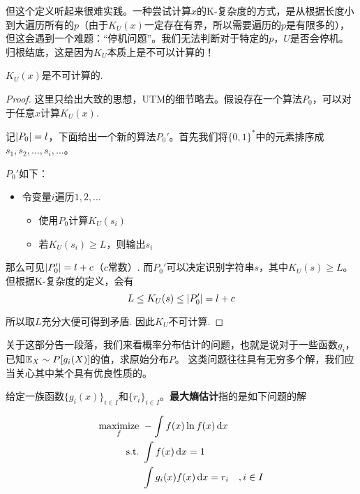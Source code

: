 但这个定义听起来很难实践。一种尝试计算$x$的K-复杂度的方式，是从根据长度小到大遍历所有的$p$（由于$K_U(x)$一定存在有界，所以需要遍历的$p$是有限多的），但这会遇到一个难题：“停机问题”。我们无法判断对于特定的$p$，$U$是否会停机。 归根结底，这是因为$K_U$本质上是不可以计算的！
\begin{theorem}
    $K_U(x)$是不可计算的. 
\end{theorem}
\begin{proof}
    这里只给出大致的思想，UTM的细节略去。假设存在一个算法$P_0$，可以对于任意$x$计算$K_U(x)$. 

    记$\left\vert P_0\right\vert = l$，下面给出一个新的算法$P_0'$。首先我们将$\{0,1\}^*$中的元素排序成$s_1,s_2,\dots,s_i,\dots$。
    
    $P_0'$如下：
    \begin{itemize}
        \item 令变量$i$遍历$1,2,\dots$
        \begin{itemize}
            \item 使用$P_0$计算$K_U(s_i)$
            \item 若$K_U(s_i) \ge L$，则输出$s_i$
        \end{itemize}
    \end{itemize}

    那么可见$\left\vert P_0'\right\vert = l + c$（$c$常数）. 而$P_0'$可以决定识别字符串$s$，其中$K_U(s) \ge L$。但根据K-复杂度的定义，会有 
    \[
    L \le K_U(s) \le \left\vert P_0'\right\vert = l + c
    \]

    所以取$L$充分大便可得到矛盾. 因此$K_U$不可计算.
\end{proof}

关于这部分告一段落，我们来看概率分布估计的问题，也就是说对于一些函数$g_i$，已知$\mathbb{E}_X\sim P [g_i(X)]$的值，求原始分布$P$。 这类问题往往具有无穷多个解，我们应当关心其中某个具有优良性质的。 
    \begin{definition}[最大熵估计]
        给定一族函数$\{g_i(x)\}_{i\in I}$和$\{r_i\}_{i \in I}$。\textbf{最大熵估计}指的是如下问题的解 
        
        \begin{align*}
            \operatorname*{maximize}_{f} \ & -\int f(x) \ln f(x) \mathop{}\!\mathrm{d}x \\
            \text{s.t.} \ & \int f(x) \mathop{}\!\mathrm{d}x = 1 \\
            \ & \int g_i(x)f(x) \mathop{}\!\mathrm{d}x = r_i\quad ,i\in I
        \end{align*}
    \end{definition}

